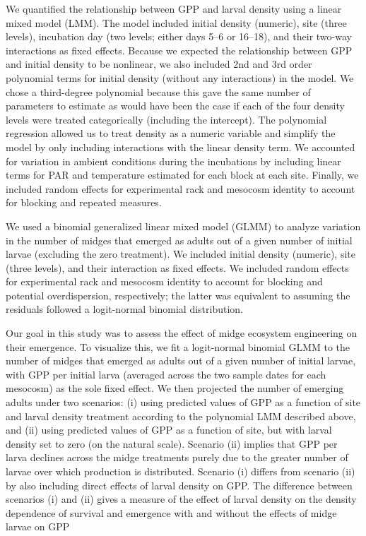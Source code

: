 \documentclass[12pt]{article}
\begin{document}
We quantified the relationship between GPP and larval density using a 
linear mixed model (LMM). 
The model included initial density (numeric), site (three levels),
incubation day (two levels; either days 5--6 or 16--18), 
and their two-way interactions as fixed effects.
Because we expected the relationship between GPP and initial density to be nonlinear,
we also included 2nd and 3rd order polynomial terms for initial density 
(without any interactions) in the model.
We chose a third-degree polynomial because this gave the same number of parameters 
to estimate as would have been the case if each of the four density levels were treated 
categorically (including the intercept). 
The polynomial regression allowed us to treat density as a numeric variable 
and simplify the model by only including interactions with the linear density term.
We accounted for variation in ambient conditions during the incubations by including
linear terms for PAR and temperature estimated for each block at each site.
Finally, we included random effects for experimental rack and mesocosm identity to account
for blocking and repeated measures.

We used a binomial generalized linear mixed model (GLMM) to analyze variation 
in the number of midges that emerged as adults
out of a given number of initial larvae
(excluding the zero treatment). 
We included initial density (numeric), site (three levels), and their interaction
as fixed effects. 
We included random effects for experimental rack and mesocosm identity to account
for blocking and potential overdispersion, respectively;
the latter was equivalent to assuming the residuals followed a 
logit-normal binomial distribution.

Our goal in this study was to assess the effect of midge ecosystem engineering 
on their emergence.  
To visualize this, we fit a logit-normal binomial GLMM 
to the number of midges that emerged as adults
out of a given number of initial larvae,
with GPP per initial larva (averaged across the two sample dates for each mesocosm)
as the sole fixed effect. 
We then projected the number of emerging adults under two scenarios: 
(i) using predicted values of GPP as a function of site
and larval density treatment according to the polynomial LMM described above, 
and (ii) using predicted values of GPP as a function of site, 
but with larval density set to zero (on the natural scale). 
Scenario (ii) implies that GPP per larva declines across the midge treatments 
purely due to the greater number of larvae over which production is distributed. 
Scenario (i) differs from scenario (ii) by also including direct effects of 
larval density on GPP. 
The difference between scenarios (i) and (ii) gives a measure of the effect 
of larval density on the density dependence of survival and emergence 
with and without the effects of midge larvae on GPP
\end{document}
